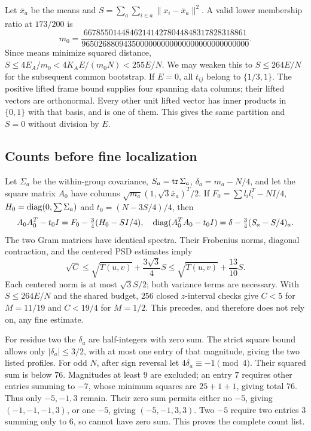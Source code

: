 Let $\bar x_a$ be the means and
$S=\sum_a\sum_{i\in a}\|x_i-\bar x_a\|^2$. A valid lower membership
ratio at $173/200$ is
\[
 m_0=\frac{667855014484621414278044848317828318861}
 {9650268809435000000000000000000000000000}.
\]
Since means minimize squared distance,
$S\le4E_A/m_0<4K_AE/(m_0N)<255E/N$. We may weaken this to
$S\le264E/N$ for the subsequent common bootstrap.
If $E=0$, all $t_{ij}$ belong to $\{1/3,1\}$.
The positive lifted frame bound supplies four spanning data columns;
their lifted vectors are orthonormal. Every other unit lifted vector
has inner products in $\{0,1\}$ with that basis, and is one of them.
This gives the same partition and $S=0$ without division by $E$.

\subsection{Counts before fine localization}
Let $\Sigma_a$ be the within-group covariance, $S_a=\operatorname{tr}\Sigma_a$,
$\delta_a=m_a-N/4$, and let the square matrix $A_0$ have columns
$\sqrt{m_a}(1,\sqrt3\bar x_a)^T/2$. If
$F_0=\sum l_il_i^T-NI/4$, $H_0=\operatorname{diag}(0,\sum\Sigma_a)$ and
$t_0=(N-3S/4)/4$, then
\[
 A_0A_0^T-t_0I=F_0-\tfrac34(H_0-SI/4),\quad
 \operatorname{diag}(A_0^TA_0-t_0I)=\delta-\tfrac34(S_a-S/4)_a.
\]
The two Gram matrices have identical spectra. Their Frobenius norms,
diagonal contraction, and the centered PSD estimates imply
\begin{equation}\label{app:global:count}
 \sqrt C\le\sqrt{T(u,v)}+\frac{3\sqrt3}{4}S
                     \le\sqrt{T(u,v)}+\frac{13}{10}S.
\end{equation}
Each centered norm is at most $\sqrt3S/2$; both variance terms are
necessary. With $S\le264E/N$ and the shared budget, $256$ closed
$z$-interval checks give $C<5$ for $M=11/19$ and $C<19/4$ for $M=1/2$.
This precedes, and therefore does not rely on, any fine estimate.

For residue two the $\delta_a$ are half-integers with zero sum. The
strict square bound allows only $|\delta_a|\le3/2$, with at most one
entry of that magnitude, giving the two listed profiles. For odd $N$,
after sign reversal let $4\delta_a\equiv-1\pmod4$. Their squared sum
is below $76$. Magnitudes at least $9$ are excluded; an entry $7$
requires other entries summing to $-7$, whose minimum squares are
$25+1+1$, giving total $76$. Thus only $-5,-1,3$ remain. Their zero
sum permits either no $-5$, giving $(-1,-1,-1,3)$, or one $-5$,
giving $(-5,-1,3,3)$. Two $-5$ require two entries $3$ summing only
to $6$, so cannot have zero sum. This proves the complete count list.

